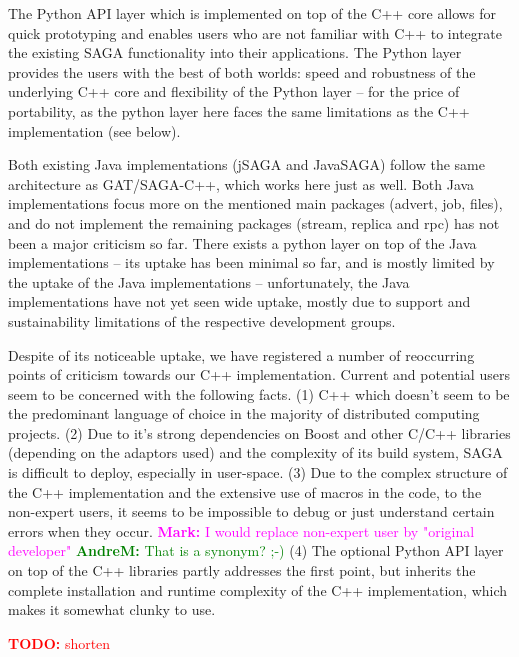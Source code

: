 \documentclass[]{article}
\newcommand{\B}[1]{\textbf{#1}}
\newcommand{\todo}[1]{{\textcolor{red}{\B{TODO:} #1 }}}
\newcommand{\amnote}[1]{{\textcolor{green}{   \B{AndreM:  } #1 }}}
\newcommand{\msnote}[1]{{\textcolor{magenta}{ \B{Mark:    } #1 }}}
\newcommand{\amnote}[1]{}
\newcommand{\msnote}[1]{}
\begin{document}
  The Python API layer which is implemented on top of the C++ core
  allows for quick prototyping and enables users who are not familiar
  with C++ to integrate the existing SAGA functionality into their
  applications.  The Python layer provides the users with the best of
  both worlds: speed and robustness of the underlying C++ core and
  flexibility of the Python layer -- for the price of portability, as
  the python layer here faces the same limitations as the C++
  implementation (see below).

  Both existing Java implementations (jSAGA and JavaSAGA) follow the
  same architecture as GAT/SAGA-C++, which works here just as well.
  Both Java implementations focus more on the mentioned main packages
  (advert, job, files), and do not implement the remaining packages
  (stream, replica and rpc) has not been a major criticism so far.
  There exists a python layer on top of the Java implementations --
  its uptake has been minimal so far, and is mostly limited by the
  uptake of the Java implementations -- unfortunately, the Java
  implementations have not yet seen wide uptake, mostly due to support
  and sustainability limitations of the respective development groups.
  
  Despite of its noticeable uptake, we have registered a number of
  reoccurring points of criticism towards our C++ implementation.
  Current and potential users seem to be concerned with the following
  facts. 
  (1) C++ which doesn't seem to be the predominant language of choice
  in the majority of distributed computing projects.
  (2) Due to it's strong dependencies on Boost and other C/C++
  libraries (depending on the adaptors used) and the complexity of its
  build system, SAGA is difficult to deploy, especially in user-space.
  (3) Due to the complex structure of the C++ implementation and the
  extensive use of macros in the code, to the non-expert users, it
  seems to be impossible to debug or just understand certain errors
  when they occur.  \msnote{I would replace non-expert user by
  "original developer"} \amnote{That is a synonym? ;-)}
  (4) The optional Python API layer on top of the C++ libraries partly
  addresses the first point, but inherits the complete installation
  and runtime complexity of the C++ implementation, which makes it
  somewhat clunky to use.

  \todo{shorten}
\end{document}
